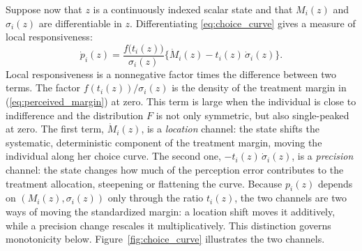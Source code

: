 \documentclass[11pt]{article}
\newcommand{\1}{\mathbf{1}}
\begin{document}
Suppose now that \(z\) is a continuously indexed scalar state and that
\(M_i(z)\) and \(\sigma_i(z)\) are differentiable in \(z\). Differentiating
\eqref{eq:choice_curve} gives a measure of local responsiveness:
\begin{equation}
\dot p_i(z)
=
\frac{f\big(t_i(z)\big)}{\sigma_i(z)}
\Big\{\dot M_i(z)-t_i(z)\,\dot\sigma_i(z)\Big\}.
\label{eq:two_channels}
\end{equation}
Local responsiveness is a nonnegative factor times the difference between two terms. The
factor \(f(t_i(z))/\sigma_i(z)\) is the density of the treatment margin in (\ref{eq:perceived_margin}) at
zero.  This term is large when the individual is close to
indifference and the distribution $F$ is not only symmetric, but also single-peaked at zero. The first term, \(\dot M_i(z)\), is a \emph{location}
channel: the state shifts the systematic, deterministic component of the treatment margin,
moving the individual along her choice curve. The second one,
\(-t_i(z)\,\dot\sigma_i(z)\), is a \emph{precision} channel: the state
changes how much of the perception error contributes to the treatment allocation, steepening or
flattening the curve. Because \(p_i(z)\) depends on
\((M_i(z),\sigma_i(z))\) only through the ratio \(t_i(z)\), the two channels
are two ways of moving the standardized margin: a location shift moves it
additively, while a precision change rescales it multiplicatively. This
distinction governs monotonicity below. Figure~\ref{fig:choice_curve} illustrates the two channels.
\end{document}
